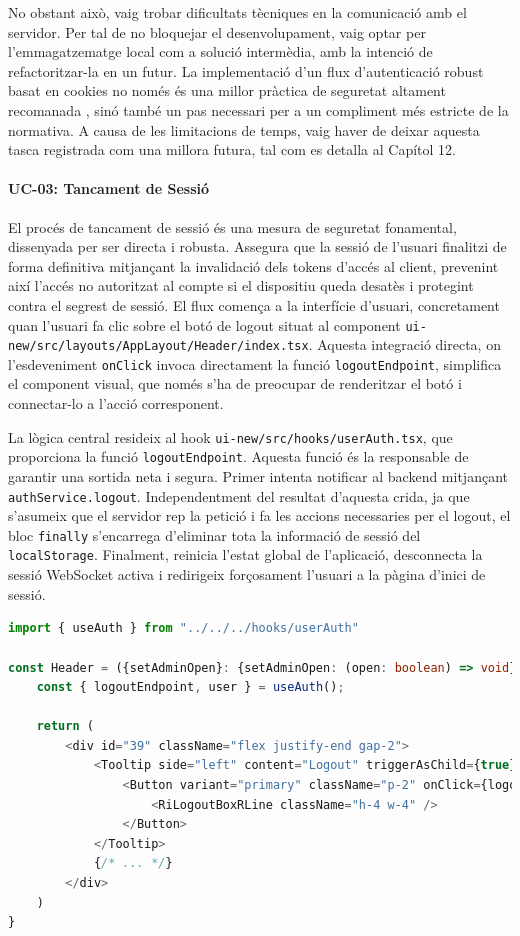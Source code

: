 No obstant això, vaig trobar dificultats tècniques en la comunicació amb el servidor. Per tal de no bloquejar el desenvolupament, vaig optar per l'emmagatzematge local com a solució intermèdia, amb la intenció de refactoritzar-la en un futur. La implementació d'un flux d'autenticació robust basat en cookies no només és una millor pràctica de seguretat altament recomanada \cite{auth0_token_best_practices}, sinó també un pas necessari per a un compliment més estricte de la normativa. A causa de les limitacions de temps, vaig haver de deixar aquesta tasca registrada com una millora futura, tal com es detalla al Capítol 12.

\paragraph{UC-03: Tancament de Sessió}
El procés de tancament de sessió és una mesura de seguretat fonamental, dissenyada per ser directa i robusta. Assegura que la sessió de l'usuari finalitzi de forma definitiva mitjançant la invalidació dels tokens d'accés al client, prevenint així l'accés no autoritzat al compte si el dispositiu queda desatès i protegint contra el segrest de sessió. El flux comença a la interfície d'usuari, concretament quan l'usuari fa clic sobre el botó de logout situat al component \texttt{ui-new/src/layouts/AppLayout/Header/index.tsx}. Aquesta integració directa, on l'esdeveniment \texttt{onClick} invoca directament la funció \texttt{logoutEndpoint}, simplifica el component visual, que només s'ha de preocupar de renderitzar el botó i connectar-lo a l'acció corresponent.

La lògica central resideix al hook \texttt{ui-new/src/hooks/userAuth.tsx}, que proporciona la funció \texttt{logoutEndpoint}. Aquesta funció és la responsable de garantir una sortida neta i segura. Primer intenta notificar al backend mitjançant \texttt{authService.logout}. Independentment del resultat d'aquesta crida, ja que s'asumeix que el servidor rep la petició i fa les accions necessaries per el logout, el bloc \texttt{finally} s'encarrega d'eliminar tota la informació de sessió del \texttt{localStorage}. Finalment, reinicia l'estat global de l'aplicació, desconnecta la sessió WebSocket activa i redirigeix forçosament l'usuari a la pàgina d'inici de sessió.

\begin{lstlisting}[language=typescript, caption={Fragment del component `Header` amb el botó de logout}]
import { useAuth } from "../../../hooks/userAuth"

const Header = ({setAdminOpen}: {setAdminOpen: (open: boolean) => void}) => {
    const { logoutEndpoint, user } = useAuth();

    return (
        <div id="39" className="flex justify-end gap-2">
            <Tooltip side="left" content="Logout" triggerAsChild={true}>
                <Button variant="primary" className="p-2" onClick={logoutEndpoint}>
                    <RiLogoutBoxRLine className="h-4 w-4" />
                </Button>
            </Tooltip>
            {/* ... */}
        </div>
    )
}
\end{lstlisting}


